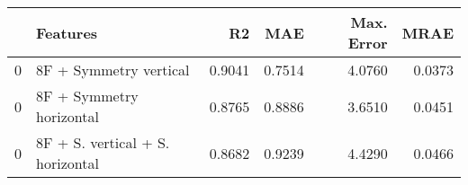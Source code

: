 \begin{tabular}{llrrrr}
\toprule
 & Features & R2 & MAE & Max. Error & MRAE \\
\midrule
0 & 8F + Symmetry vertical & 0.9041 & 0.7514 & 4.0760 & 0.0373 \\
0 & 8F + Symmetry horizontal & 0.8765 & 0.8886 & 3.6510 & 0.0451 \\
0 & 8F + S. vertical + S. horizontal & 0.8682 & 0.9239 & 4.4290 & 0.0466 \\
\bottomrule
\end{tabular}
